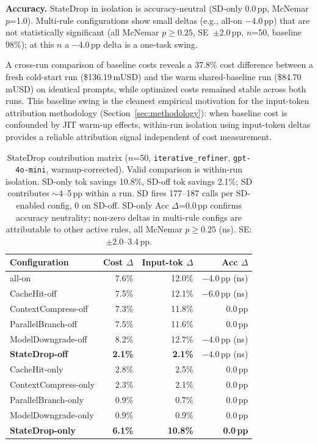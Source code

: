 \documentclass[sigconf,9pt]{acmart}
\begin{document}
\textbf{Accuracy.} StateDrop in isolation is accuracy-neutral (SD-only 0.0\,pp,
McNemar $p$=1.0). Multi-rule configurations show small deltas (e.g., all-on
$-$4.0\,pp) that are not statistically significant (all McNemar $p \geq 0.25$,
SE~$\pm$2.0\,pp, $n$=50, baseline 98\%); at this $n$ a $-$4.0\,pp delta is a
one-task swing.

A cross-run comparison of baseline costs reveals a 37.8\% cost difference between a
fresh cold-start run (\$136.19\,mUSD) and the warm shared-baseline run
(\$84.70\,mUSD) on identical prompts, while optimized costs remained stable across
both runs. This baseline swing is the cleanest empirical motivation for the
input-token attribution methodology (Section~\ref{sec:methodology}): when baseline
cost is confounded by JIT warm-up effects, within-run isolation using input-token
deltas provides a reliable attribution signal independent of cost measurement.

\begin{table}[t]
\caption{StateDrop contribution matrix ($n$=50, \texttt{iterative\_refiner},
\texttt{gpt-4o-mini}, warmup-corrected). Valid comparison is within-run isolation.
SD-only tok savings 10.8\%, SD-off tok savings 2.1\%; SD contributes $\sim$4--5\,pp
within a run. SD fires 177--187 calls per SD-enabled config, 0 on SD-off.
SD-only Acc $\Delta$=0.0\,pp confirms accuracy neutrality; non-zero deltas in
multi-rule configs are attributable to other active rules, all McNemar
$p \geq 0.25$ (ns). SE: $\pm$2.0--3.4\,pp.}
\label{tab:sd-matrix}
\small
\begin{tabular}{lrrr}
\toprule
Configuration & Cost $\Delta$ & Input-tok $\Delta$ & Acc $\Delta$ \\
\midrule
all-on                          & 7.6\%  & 12.0\%  & $-$4.0\,pp (ns) \\
CacheHit-off                    & 7.5\%  & 12.1\%  & $-$6.0\,pp (ns) \\
ContextCompress-off             & 7.3\%  & 11.8\%  & 0.0\,pp \\
ParallelBranch-off              & 7.5\%  & 11.6\%  & 0.0\,pp \\
ModelDowngrade-off              & 8.2\%  & 12.7\%  & $-$4.0\,pp (ns) \\
\textbf{StateDrop-off}          & \textbf{2.1\%}  & \textbf{2.1\%}  & $-$4.0\,pp (ns) \\
\midrule
CacheHit-only                   & 2.8\%  & 2.5\%   & 0.0\,pp \\
ContextCompress-only            & 2.3\%  & 2.1\%   & 0.0\,pp \\
ParallelBranch-only             & 0.9\%  & 0.7\%   & 0.0\,pp \\
ModelDowngrade-only             & 0.9\%  & 0.9\%   & 0.0\,pp \\
\textbf{StateDrop-only}         & \textbf{6.1\%}  & \textbf{10.8\%} & \textbf{0.0\,pp} \\
\bottomrule
\end{tabular}
\end{table}
\end{document}
